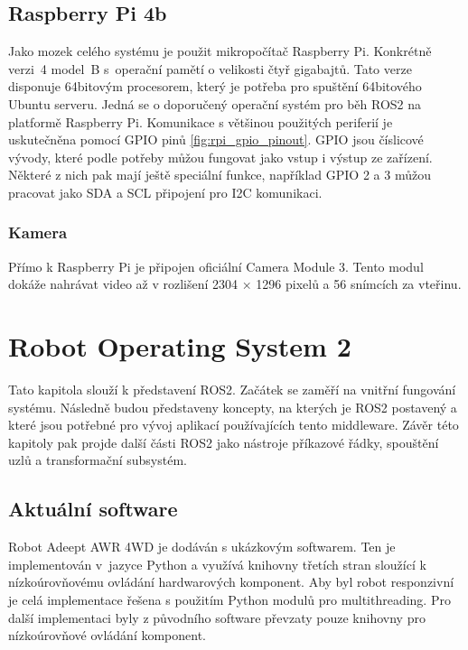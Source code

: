 \section{Raspberry Pi 4b}
Jako mozek celého systému je použit mikropočítač Raspberry Pi. Konkrétně verzi~4 model~B s~operační pamětí o velikosti čtyř gigabajtů. Tato verze disponuje 64bitovým procesorem, který je potřeba pro spuštění 64bitového Ubuntu serveru. Jedná se o doporučený operační systém pro běh ROS2 na platformě Raspberry Pi.
Komunikace s většinou použitých periferií je uskutečněna pomocí GPIO pinů \ref{fig:rpi_gpio_pinout}. GPIO jsou číslicové vývody, které podle potřeby můžou fungovat jako vstup i výstup ze zařízení. Některé z nich pak mají ještě speciální funkce, například GPIO 2 a 3 můžou pracovat jako SDA a SCL připojení pro I2C komunikaci. \cite{rpi_documentation}

\subsection*{Kamera}
Přímo k Raspberry Pi je připojen oficiální Camera Module 3. Tento modul dokáže nahrávat video až v rozlišení 2304 × 1296 pixelů a 56 snímcích za vteřinu. \cite{rpi_documentation}

\chapter{Robot Operating System 2}
Tato kapitola slouží k představení ROS2. Začátek se zaměří na vnitřní fungování systému. Následně budou představeny koncepty, na kterých je ROS2 postavený a které jsou potřebné pro vývoj aplikací používajících tento middleware. Závěr této kapitoly pak projde další části ROS2 jako nástroje příkazové řádky, spouštění uzlů a transformační subsystém.

\section{Aktuální software}
Robot Adeept AWR 4WD je dodáván s ukázkovým softwarem. Ten je implementován v~jazyce Python a využívá knihovny třetích stran sloužící k nízkoúrovňovému ovládání hardwarových komponent. Aby byl robot responzivní je celá implementace řešena s použitím Python modulů pro multithreading. Pro další implementaci byly z původního software převzaty pouze knihovny pro nízkoúrovňové ovládání komponent.

